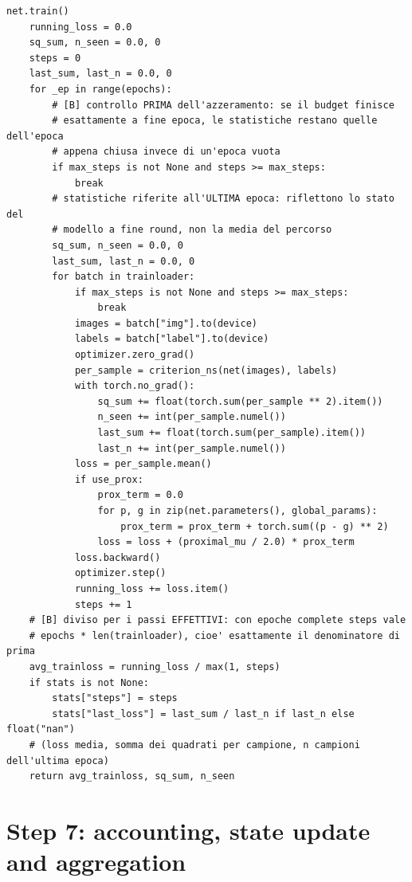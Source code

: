 \documentclass[11pt,a4paper]{article}
\begin{document}
\begin{lstlisting}[style=py,firstnumber=5,caption={\texttt{tesifl/tesiFL/task.py}, lines 5--80}]
    net.train()
    running_loss = 0.0
    sq_sum, n_seen = 0.0, 0
    steps = 0
    last_sum, last_n = 0.0, 0
    for _ep in range(epochs):
        # [B] controllo PRIMA dell'azzeramento: se il budget finisce
        # esattamente a fine epoca, le statistiche restano quelle dell'epoca
        # appena chiusa invece di un'epoca vuota
        if max_steps is not None and steps >= max_steps:
            break
        # statistiche riferite all'ULTIMA epoca: riflettono lo stato del
        # modello a fine round, non la media del percorso
        sq_sum, n_seen = 0.0, 0
        last_sum, last_n = 0.0, 0
        for batch in trainloader:
            if max_steps is not None and steps >= max_steps:
                break
            images = batch["img"].to(device)
            labels = batch["label"].to(device)
            optimizer.zero_grad()
            per_sample = criterion_ns(net(images), labels)
            with torch.no_grad():
                sq_sum += float(torch.sum(per_sample ** 2).item())
                n_seen += int(per_sample.numel())
                last_sum += float(torch.sum(per_sample).item())
                last_n += int(per_sample.numel())
            loss = per_sample.mean()
            if use_prox:
                prox_term = 0.0
                for p, g in zip(net.parameters(), global_params):
                    prox_term = prox_term + torch.sum((p - g) ** 2)
                loss = loss + (proximal_mu / 2.0) * prox_term
            loss.backward()
            optimizer.step()
            running_loss += loss.item()
            steps += 1
    # [B] diviso per i passi EFFETTIVI: con epoche complete steps vale
    # epochs * len(trainloader), cioe' esattamente il denominatore di prima
    avg_trainloss = running_loss / max(1, steps)
    if stats is not None:
        stats["steps"] = steps
        stats["last_loss"] = last_sum / last_n if last_n else float("nan")
    # (loss media, somma dei quadrati per campione, n campioni dell'ultima epoca)
    return avg_trainloss, sq_sum, n_seen
\end{lstlisting}

\newpage
\section{Step 7: accounting, state update and aggregation}
\label{sec:aggregate}
\end{document}
